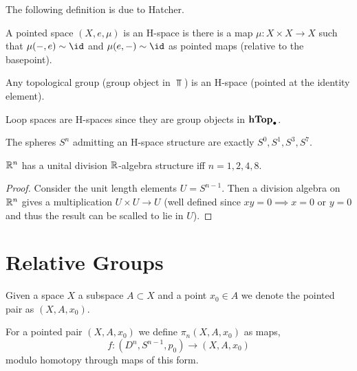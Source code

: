 \documentclass[12pt]{extarticle}
\begin{document}
\begin{remark}
The following definition is due to Hatcher. 
\end{remark}

\begin{definition}
A pointed space $(X, e, \mu)$ is an H-space is there is a map $\mu : X \times X \to X$ such that $\mu(-, e) \sim \id$ and $\mu(e, -) \sim \id$ as pointed maps (relative to the basepoint).  
\end{definition}

\begin{remark}
Any topological group (group object in $\Top$) is an H-space (pointed at the identity element). 
\end{remark}

\begin{remark}
Loop spaces are H-spaces since they are group objects in $\mathbf{hTop}_{\bullet}$. 
\end{remark}

\begin{theorem}[Adams]
The spheres $S^n$ admitting an H-space structure are exactly $S^0, S^1, S^3, S^7$. 
\end{theorem}

\begin{corollary}
$\mathbb{R}^n$ has a unital division $\mathbb{R}$-algebra structure iff $n = 1,2,4,8$. 
\end{corollary} 

\begin{proof}
Consider the unit length elements $U = S^{n-1}$. Then a division algebra on $\mathbb{R}^n$ gives a multiplication $U \times U \to U$ (well defined since $xy = 0 \implies x = 0 \text{ or } y = 0$ and thus the result can be scalled to lie in $U$). 
\end{proof}

\section{Relative Groups}

\begin{definition}
Given a space $X$ a subspace $A \subset X$ and a point $x_0 \in A$ we denote the pointed pair as $(X, A, x_0)$. 
\end{definition}

\begin{definition}
For a pointed pair $(X, A, x_0)$ we define $\pi_n(X, A, x_0)$ as maps,
\[ f : (D^n, S^{n-1}, p_0) \to (X, A, x_0) \]
modulo homotopy through maps of this form. 
\end{definition}
\end{document}
